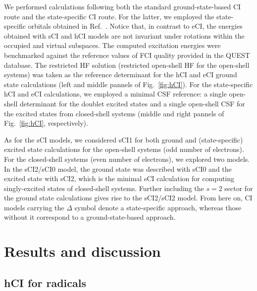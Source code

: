\documentclass[aip,jcp,reprint,noshowkeys,superscriptaddress]{revtex4-1}
\begin{document}
We performed calculations following both the standard ground-state-based CI route and the state-specific CI route. \cite{Kossoski_2023}
For the latter, we employed the state-specific orbitals obtained in Ref.~.
Notice that, in contrast to eCI, the energies obtained with sCI and hCI models are not invariant under rotations within the occupied and virtual subspaces.
The computed excitation energies were benchmarked against the reference values of FCI quality provided in the QUEST database. \cite{Veril_2021}
The restricted HF solution (restricted open-shell HF for the open-shell systems) was taken as the reference determinant for the hCI and eCI ground state calculations
(left and middle pannels of Fig.~\ref{fig:hCI}).
For the state-specific hCI and eCI calculations, we employed a minimal CSF reference: \cite{Kossoski_2023}
a single open-shell determinant for the doublet excited states and a single open-shell CSF for the excited states from closed-shell systems
(middle and right pannels of Fig.~\ref{fig:hCI}, respectively).

As for the sCI models,
we considered sCI1 for both ground and (state-specific) excited state calculations for the open-shell systems (odd number of electrons).
For the closed-shell systems (even number of electrons), we explored two models.
In the sCI2/sCI0 model, the ground state was described with sCI0 and the excited state with sCI2, which is the minimal sCI calculation for computing singly-excited states of closed-shell systems.
Further including the $s=2$ sector for the ground state calculations gives rise to the sCI2/sCI2 model.
From here on, CI models carrying the $\Delta$ symbol denote a state-specific approach, whereas those without it correspond to a ground-state-based approach.


\section{Results and discussion}
\label{sec:res}

\subsection{hCI for radicals}
\label{sec:res_A}
\end{document}
